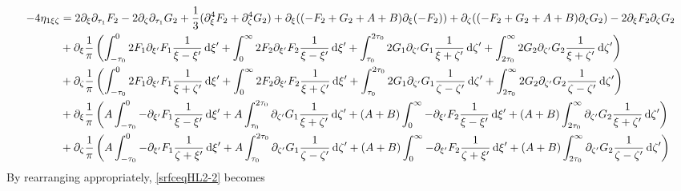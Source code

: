 \documentclass[10pt,reqno,oneside,a4paper, landscape]{article}
\begin{document}
\begin{equation}\label{srfceqHL2-2}
\begin{aligned}
- 4\eta_{1\xi \zeta} &= 2 \partial_\xi \partial_{\tau_1}F_2 - 2\partial_{\zeta} \partial_{\tau_1}G_2  + \frac{1}{3}(\partial_\xi^4 F_2 + \partial_\zeta^4 G_2) + \partial_\xi ((-F_2 + G_2 + A +B)\partial_\xi(-F_2)) + \partial_\zeta ((-F_2 + G_2 + A +B)\partial_\zeta G_2) - 2 \partial_\xi F_2 \partial_\zeta G_2\nonumber \\
&+ \partial_\xi\frac{1}{\pi}
\left( \int^0_{-\tau_0} 2 F_1 \partial_{\xi'} F_1 \frac{1}{\xi -\xi'} \,\mathrm{d} \xi' + \int^{\infty}_{0} 2 F_2 \partial_{\xi'} F_2 \frac{1}{\xi -\xi'} \,\mathrm{d} \xi' + \int^{2\tau_0}_{\tau_0} 2 G_1 \partial_{\zeta'} G_1 \frac{1}{\xi + \zeta'} \,\mathrm{d} \zeta' + \int^{\infty}_{2\tau_0} 2 G_2 \partial_{\zeta'} G_2 \frac{1}{\xi + \zeta'} \,\mathrm{d} \zeta' \right) \\
&+ \partial_\zeta\frac{1}{\pi} \left( \int^0_{-\tau_0} 2 F_1 \partial_{\xi'} F_1 \frac{1}{\xi + \zeta'} \,\mathrm{d} \xi' + \int^{\infty}_{0} 2 F_2 \partial_{\xi'} F_2 \frac{1}{\xi + \zeta'} \,\mathrm{d} \xi' + \int^{2\tau_0}_{\tau_0} 2 G_1 \partial_{\zeta'} G_1 \frac{1}{\zeta -\zeta'} \,\mathrm{d} \zeta' + \int^{\infty}_{2\tau_0} 2 G_2 \partial_{\zeta'} G_2 \frac{1}{\zeta -\zeta'} \,\mathrm{d} \zeta' \right) \\
&+ \partial_\xi \frac{1}{\pi} \left( A \int^0_{-\tau_0} -\partial_{\xi'}F_1 \frac{1}{\xi - \xi'} \,\mathrm{d} \xi' + A\int^{2\tau_0}_{\tau_0} \partial_{\zeta'} G_1 \frac{1}{\xi + \zeta'} \,\mathrm{d} \zeta' + (A+B)\int_0^{\infty} -\partial_{\xi'} F_2 \frac{1}{\xi - \xi'} \,\mathrm{d} \xi' + (A+B)\int_{2\tau_0}^{\infty} \partial_{\zeta'} G_2 \frac{1}{\xi + \zeta'} \,\mathrm{d} \zeta' \right) \nonumber \\
&+ \partial_\zeta \frac{1}{\pi} \left( A \int^0_{-\tau_0} -\partial_{\xi'} F_1  \frac{1}{\zeta + \xi'}  \,\mathrm{d} \xi' + A\int^{2\tau_0}_{\tau_0} \partial_{\zeta'} G_1 \frac{1}{\zeta - \zeta'} \,\mathrm{d} \zeta' + (A+B) \int_0^{\infty} -\partial_{\xi'} F_2  \frac{1}{\zeta + \xi'} \,\mathrm{d} \xi'  + (A+B)\int_{2\tau_0}^{\infty} \partial_{\zeta'} G_2 \frac{1}{\zeta - \zeta'}\,\mathrm{d} \zeta' \right)
\end{aligned}
\end{equation}
By rearranging appropriately, \eqref{srfceqHL2-2} becomes
\end{document}
